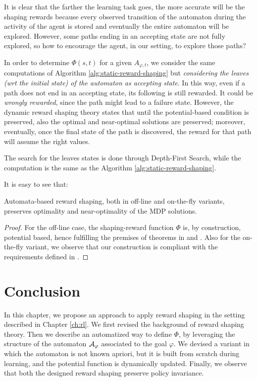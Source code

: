 It is clear that the farther the learning task goes, the more accurate will be the shaping rewards because every observed transition of the automaton during the activity of the agent is stored and eventually the entire automaton will be explored. However, some paths ending in an accepting state are not fully explored, so how to encourage the agent, in our setting, to explore those paths?

In order to determine $\Phi(s, t)$ for a given $A_{\varphi, t}$, we consider the same computations of Algorithm \ref{alg:static-reward-shaping} but \emph{considering the leaves (wrt the initial state) of the automaton as accepting state}. In this way, even if a path does not end in an accepting state, its following is still rewarded. It could be \emph{wrongly rewarded}, since the path might lead to a failure state. However, the dynamic reward shaping theory states that until the potential-based condition is preserved, also the optimal and near-optimal solutions are preserved; moreover, eventually, once the final state of the path is discovered, the reward for that path will assume the right values.

The search for the leaves states is done through Depth-First Search, while the computation is the same as the Algorithm \ref{alg:static-reward-shaping}.

\medskip
It is easy to see that:

\begin{theorem}
	Automata-based reward shaping, both in off-line and on-the-fly variants, preserves optimality and near-optimality of the MDP solutions.
\end{theorem}
\begin{proof} For the off-line case, the shaping-reward function $\Phi$ is, by construction, potential based, hence fulfilling the premises of theorems in \citep{Ng:1999:PIU:645528.657613} and \citep{Grzes:2017:RSE:3091125.3091208}.
	Also for the on-the-fly variant, we observe that our construction is compliant with the requirements defined in \citep{Devlin:2012:DPR:2343576.2343638}.
\end{proof}


\section{Conclusion}
In this chapter, we propose an approach to apply reward shaping in the setting described in Chapter \ref{ch:rl}. We first revised the background of reward shaping theory. Then we describe an automatized way to define $\Phi$, by leveraging the structure of the automaton $\mathcal{A}_{\varphi}$ associated to the \LLf goal $\varphi$. We devised a variant in which the automaton is not known apriori, but it is built from scratch during learning, and the potential function is dynamically updated. Finally, we observe that both the designed reward shaping preserve policy invariance.